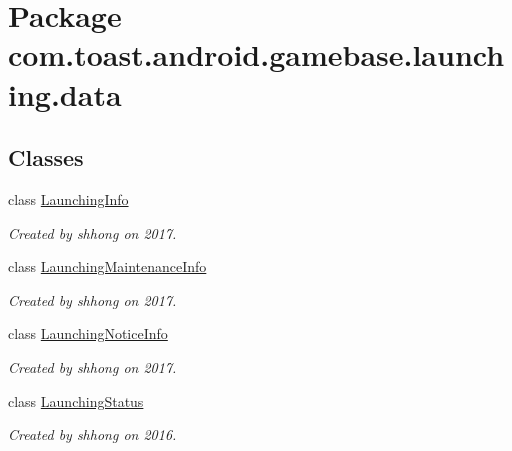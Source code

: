 \hypertarget{namespacecom_1_1toast_1_1android_1_1gamebase_1_1launching_1_1data}{}\section{Package com.\+toast.\+android.\+gamebase.\+launching.\+data}
\label{namespacecom_1_1toast_1_1android_1_1gamebase_1_1launching_1_1data}
\subsection*{Classes}
\begin{DoxyCompactItemize}
\item 
class \hyperlink{classcom_1_1toast_1_1android_1_1gamebase_1_1launching_1_1data_1_1_launching_info}{Launching\+Info}
\begin{DoxyCompactList}\small\item\em Created by shhong on 2017. \end{DoxyCompactList}\item 
class \hyperlink{classcom_1_1toast_1_1android_1_1gamebase_1_1launching_1_1data_1_1_launching_maintenance_info}{Launching\+Maintenance\+Info}
\begin{DoxyCompactList}\small\item\em Created by shhong on 2017. \end{DoxyCompactList}\item 
class \hyperlink{classcom_1_1toast_1_1android_1_1gamebase_1_1launching_1_1data_1_1_launching_notice_info}{Launching\+Notice\+Info}
\begin{DoxyCompactList}\small\item\em Created by shhong on 2017. \end{DoxyCompactList}\item 
class \hyperlink{classcom_1_1toast_1_1android_1_1gamebase_1_1launching_1_1data_1_1_launching_status}{Launching\+Status}
\begin{DoxyCompactList}\small\item\em Created by shhong on 2016. \end{DoxyCompactList}\end{DoxyCompactItemize}
